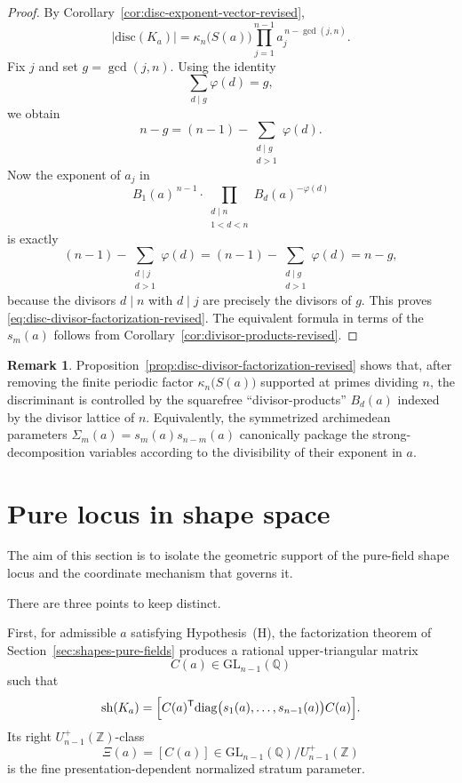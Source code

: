 \documentclass[11pt,letterpaper]{amsart}
\newcommand{\Q}{\mathbb{Q}}
\newcommand{\Z}{\mathbb{Z}}
\newcommand{\GL}{\mathrm{GL}}
\newcommand{\diag}{\mathrm{diag}}
\newcommand{\disc}{\mathrm{disc}}
\theoremstyle{plain}
\theoremstyle{definition}
\newtheorem{remark}[theorem]{Remark}
\begin{document}
\begin{proof}
By Corollary~\ref{cor:disc-exponent-vector-revised},
\[
|\disc(K_a)|=\kappa_n\bigl(S(a)\bigr)\prod_{j=1}^{n-1} a_j^{\,n-\gcd(j,n)}.
\]
Fix $j$ and set $g=\gcd(j,n)$.
Using the identity
\[
\sum_{d\mid g}\varphi(d)=g,
\]
we obtain
\[
n-g=(n-1)-\sum_{\substack{d\mid g\\ d>1}}\varphi(d).
\]
Now the exponent of $a_j$ in
\[
B_1(a)^{\,n-1}\cdot \prod_{\substack{d\mid n\\ 1<d<n}} B_d(a)^{-\varphi(d)}
\]
is exactly
\[
(n-1)-\sum_{\substack{d\mid j\\ d>1}}\varphi(d)
=(n-1)-\sum_{\substack{d\mid g\\ d>1}}\varphi(d)
=n-g,
\]
because the divisors $d\mid n$ with $d\mid j$ are precisely the divisors of $g$.
This proves \eqref{eq:disc-divisor-factorization-revised}.
The equivalent formula in terms of the $s_m(a)$ follows from
Corollary~\ref{cor:divisor-products-revised}.
\end{proof}

\begin{remark}\label{rem:disc-divisor-interpretation}
Proposition~\ref{prop:disc-divisor-factorization-revised} shows that, after removing the finite periodic factor
$\kappa_n\bigl(S(a)\bigr)$ supported at primes dividing $n$, the discriminant is controlled by the squarefree
``divisor-products'' $B_d(a)$ indexed by the divisor lattice of $n$.
Equivalently, the symmetrized archimedean parameters $\Sigma_m(a)=s_m(a)s_{n-m}(a)$ canonically package the
strong-decomposition variables according to the divisibility of their exponent in $a$.
\end{remark}

\section{Pure locus in shape space}
\label{sec:paired-rational-leaves}

The aim of this section is to isolate the geometric support of the pure-field
shape locus and the coordinate mechanism that governs it.

There are three points to keep distinct.

First, for admissible \(a\) satisfying Hypothesis~\textup{(H)}, the
factorization theorem of Section~\ref{sec:shapes-pure-fields} produces a
rational upper-triangular matrix
\[
C(a)\in \GL_{n-1}(\Q)
\]
such that
\[
\operatorname{sh}(K_a)
=
\Bigl[
C(a)^{\mathsf T}\diag\bigl(s_1(a),\dots,s_{n-1}(a)\bigr)C(a)
\Bigr].
\]
Its right \(U_{n-1}^+(\Z)\)-class
\[
\Xi(a)=[C(a)]\in \GL_{n-1}(\Q)/U_{n-1}^+(\Z)
\]
is the fine presentation-dependent normalized stratum parameter.
\end{document}
